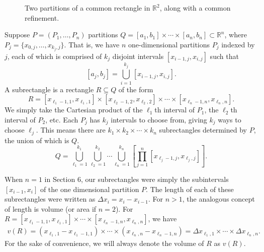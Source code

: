 \documentclass{article}
\newcommand{\R}{\mathbb{R}}
\newcommand{\brk}[1]{ \left[#1\right] }
\newcommand{\paren}[1]{ \left(#1\right) }
\theoremstyle{definition}
\begin{document}
\begin{figure}[h]
		\caption{Two partitions of a common rectangle in $ \R^2 $, along with a common refinement.}
	\end{figure}

Suppose $ P = (P_1,\ldots, P_n) $ partitions $ Q=[a_1,b_1]\times \cdots \times [a_n,b_n]\subset \R^n $, where $ P_j=\{x_{0,j},\ldots , x_{k_j,j}\} $. That is, we have $ n $ one-dimensional partitions $ P_j $ indexed by $ j $, each of which is comprised of $ k_j $ disjoint intervals $ [x_{i-1,j},x_{i,j}] $ such that 
$$ [a_j,b_j]= \bigcup_{i=1}^{k_j}[x_{i-1,j},x_{i,j}] .$$ A subrectangle is a rectangle $ R\subseteq Q $ of the form 
$$ R=[x_{\ell_1-1,1},x_{\ell_1,1}]\times [x_{\ell_2-1,2},x_{\ell_2,2}] \times \cdots \times [x_{\ell_n-1,n},x_{\ell_n,n}].$$ We simply take the Cartesian product of the $ \ell_1 $th interval of $ P_1 $, the $ \ell_2 $th interval of $ P_2 $, etc. Each $ P_j $ has $ k_j $ intervals to choose from, giving $ k_j $ ways to choose $ \ell_j $. This means there are $k_1\times k_2\times \cdots \times k_n $ subrectangles determined by $ P $, the union of which is $ Q $. 
$$ Q=\bigcup_{\ell _1 = 1}^{k_1}\bigcup_{\ell _2 = 1}^{k_2}\cdots \bigcup_{\ell _n = 1}^{k_n}\brk{\prod_{j=1}^{n}\brk{x_{\ell_j-1,j},x_{\ell_j,j}}}.$$


When $ n=1 $ in Section 6, our subrectangles were simply the subintervals $ [x_{i-1},x_i] $ of the one dimensional partition $ P $. The length of each of these subrectangles were written as $ \Delta x_i = x_{i}-x_{i-1} $. For $ n > 1 $, the analogous concept of length is volume (or area if $ n = 2 $). For $ R = [x_{\ell_1-1,1},x_{\ell_1,1}]\times \cdots \times [x_{\ell_n-1,n},x_{\ell_n,n}]$, we have 
\begin{align*}
	v(R) = \paren{x_{\ell_1,1} - x_{\ell_1-1,1}}\times \cdots \times \paren{x_{\ell_n,n} - x_{\ell_n-1,n}}
	= \Delta x_{\ell_1,1}\times \cdots \times \Delta x_{\ell_n,n}.
\end{align*}
For the sake of convenience, we will always denote the volume of $ R $ as $ v(R) $.
\end{document}
